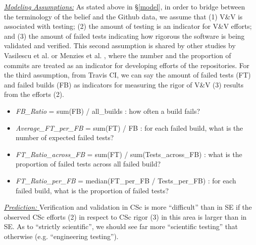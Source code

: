 \documentclass[conference,10pt]{IEEEtran}
\newcommand{\bi}{\begin{itemize}}
\newcommand{\ei}{\end{itemize}}
\begin{document}
\noindent\textit{\underline{Modeling Assumptions:}} 
As stated above in \S\ref{model},
in order to bridge between the terminology of the belief and the Github data, we assume that (1) V\&V is associated with testing; (2) the amount of testing is an indicator for V\&V efforts; and (3) the amount of failed tests indicating how rigorous the software is being validated and verified. This second assumption is shared by
other
studies  by Vasilescu et al. \cite{vasilescu16_limit} or Menzies et al. \cite{xia2019sequential}, where the number and the proportion of commits are treated as an indicator for developing efforts of the repositories. For the third assumption, from Travis CI, we can say the amount of failed tests (FT) and failed builds (FB) as indicators for measuring the rigor of V\&V (3) results from the efforts (2).  

\bi
 \item  \textit{FB\_Ratio} = sum(FB) / all\_builds : how often a build fails? 
 \item  \textit{Average\_FT\_per\_FB} = sum(FT) / FB : for each failed build, what is the number of expected failed tests? 
 \item  \textit{FT\_Ratio\_across\_FB} = sum(FT) / sum(Tests\_across\_FB) : what is the proportion of failed tests across all failed build? 
 \item  \textit{FT\_Ratio\_per\_FB} = median(FT\_per\_FB / Tests\_per\_FB) : for each failed build, what is the proportion of failed tests?
\ei

\noindent \textit{\underline{Prediction: }}
Verification and validation in CSc is more
``difficult'' than in SE if the observed CSc efforts (2) in respect to CSc rigor (3) in this area
is larger than in SE. As to ``strictly scientific'', we should see far more ``scientific
testing'' that otherwise (e.g. ``engineering testing''). 
\end{document}
